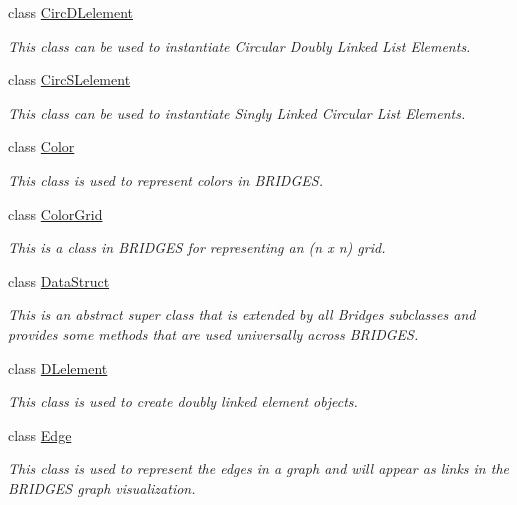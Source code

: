 \begin{DoxyCompactItemize}
class \mbox{\hyperlink{classbridges_1_1base_1_1_circ_d_lelement}{Circ\+D\+Lelement}}
\begin{DoxyCompactList}\small\item\em This class can be used to instantiate Circular Doubly Linked List Elements. \end{DoxyCompactList}\item 
class \mbox{\hyperlink{classbridges_1_1base_1_1_circ_s_lelement}{Circ\+S\+Lelement}}
\begin{DoxyCompactList}\small\item\em This class can be used to instantiate Singly Linked Circular List Elements. \end{DoxyCompactList}\item 
class \mbox{\hyperlink{classbridges_1_1base_1_1_color}{Color}}
\begin{DoxyCompactList}\small\item\em This class is used to represent colors in B\+R\+I\+D\+G\+ES. \end{DoxyCompactList}\item 
class \mbox{\hyperlink{classbridges_1_1base_1_1_color_grid}{Color\+Grid}}
\begin{DoxyCompactList}\small\item\em This is a class in B\+R\+I\+D\+G\+ES for representing an (n x n) grid. \end{DoxyCompactList}\item 
class \mbox{\hyperlink{classbridges_1_1base_1_1_data_struct}{Data\+Struct}}
\begin{DoxyCompactList}\small\item\em This is an abstract super class that is extended by all Bridges subclasses and provides some methods that are used universally across B\+R\+I\+D\+G\+ES. \end{DoxyCompactList}\item 
class \mbox{\hyperlink{classbridges_1_1base_1_1_d_lelement}{D\+Lelement}}
\begin{DoxyCompactList}\small\item\em This class is used to create doubly linked element objects. \end{DoxyCompactList}\item 
class \mbox{\hyperlink{classbridges_1_1base_1_1_edge}{Edge}}
\begin{DoxyCompactList}\small\item\em This class is used to represent the edges in a graph and will appear as links in the B\+R\+I\+D\+G\+ES graph visualization. \end{DoxyCompactList}\item 

\end{DoxyCompactItemize}
